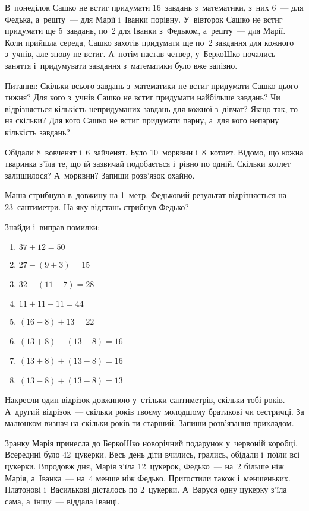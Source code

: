 \problem
В~понеділок Сашко не встиг придумати 16~завдань з~математики,
з~них 6~--- для Федька, а~решту~--- для Марії і~Іванки порівну.
У~вівторок Сашко не встиг придумати ще 5~завдань,
по~2 для Іванки з~Федьком, а~решту~--- для Марії.
Коли прийшла середа, Сашко захотів придумати
ще по~2 завдання для кожного з~учнів, але знову не встиг.
А~потім настав четвер, у~БеркоШко почались заняття
і~придумувати завдання з~математики було вже запізно.

Питання:
Скільки всього завдань з~математики не встиг придумати Сашко цього тижня?
Для кого з~учнів Сашко не встиг придумати найбільше завдань?
Чи відрізняється кількість непридуманих завдань для кожної з~дівчат?
Якщо так, то на скільки?
Для кого Сашко не встиг придумати парну, а~для кого непарну кількість завдань?


\problem
Обідали 8~вовченят і~6~зайченят. Було 10~морквин і~8~котлет.
Відомо, що кожна тваринка з'їла те, що їй зазвичай подобається
і~рівно по одній.
Скільки котлет залишилося? А~морквин? Запиши розв'язок охайно.


\problem
Маша стрибнула в~довжину на 1~метр.
Федьковий результат відрізняється на 23~сантиметри.
На яку відстань стрибнув Федько?


\problem
Знайди і~виправ помилки:
\begin{multicols}{2}
    \begin{enumerate}
        \item $37 + 12 = 50$
        \item $27 - (9 + 3) = 15$
        \item $32 - (11 - 7) = 28$
        \item $11 + 11 + 11 = 44$
        \item $(16 - 8) + 13 = 22$
        \item $(13 + 8) - (13 - 8) = 16$
        \item $(13 + 8) + (13 - 8) = 16$
        \item $(13 - 8) + (13 - 8) = 13$
    \end{enumerate}
\end{multicols}


\problem
Накресли один відрізок довжиною у~стільки сантиметрів, скільки тобі років.
А~другий відрізок~--- скільки років твоєму молодшому братикові чи сестричці.
За малюнком визнач на скільки років ти старший.
Запиши розв’язання прикладом.


\problem
Зранку Марія принесла до БеркоШко новорічний подарунок у~червоній коробці.
Всередині було 42~цукерки.
Весь день діти вчились, грались, обідали і~поїли всі цукерки.
Впродовж дня, Марія з’їла 12~цукерок, Федько~--- на~2 більше ніж Марія,
а~Іванка~--- на~4 менше ніж Федько.
Пригостили також і~меншеньких. Платонові і~Василькові дісталось по 2~цукерки.
А~Варуся одну цукерку з’їла сама, а~іншу~--- віддала Іванці.

